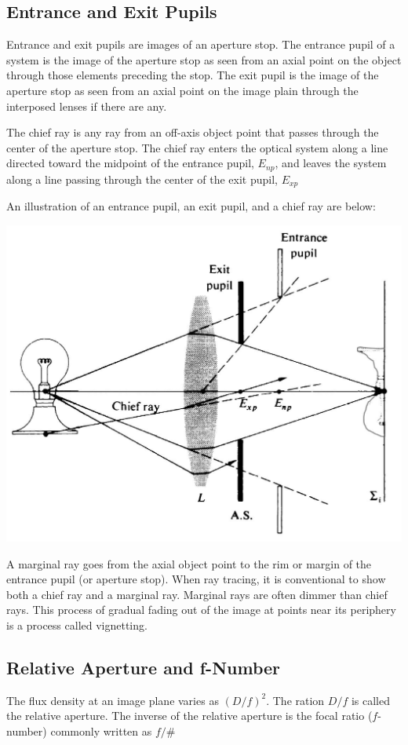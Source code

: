 \documentclass[12pt]{report}
\begin{document}
\subsection{Entrance and Exit Pupils}
Entrance and exit pupils are images of an aperture stop. The entrance pupil of a system is the image of the aperture stop as seen from an axial point on the object through those elements preceding the stop. The exit pupil is the image of the aperture stop as seen from an axial point on the image plain through the interposed lenses if there are any. 

The chief ray is any ray from an off-axis object point that passes through the center of the aperture stop. The chief ray enters the optical system along a line directed toward the midpoint of the entrance pupil, $E_{np}$, and leaves the system along a line passing through the center of the exit pupil, $E_{xp}$ 

An illustration of an entrance pupil, an exit pupil, and a chief ray are below:

\includegraphics[scale=.25]{ChiefRay.jpg}

A marginal ray goes from the axial object point to the rim or margin of the entrance pupil (or aperture stop). When ray tracing, it is conventional to show both a chief ray and a marginal ray. Marginal rays are often dimmer than chief rays. This process of gradual fading out of the image at points near its periphery is a process called vignetting. 

\subsection{Relative Aperture and f-Number}
The flux density at an image plane varies as $(D/f)^2$. The ration $D/f$ is called the relative aperture. The inverse of the relative aperture is the focal ratio ($f$-number) commonly written as $f/\#$
\end{document}
